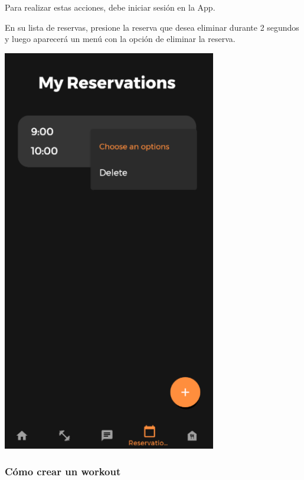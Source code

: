 \documentclass[12pt,a4paper]{article}
\begin{document}
\begin{enumerate}
\item Para realizar estas acciones, debe iniciar sesión en la App.

\begin{minipage}{.60\textwidth}
  \item En su lista de reservas, presione la reserva que desea eliminar durante 2 segundos y luego aparecerá un menú con la opción de eliminar la reserva.
\end{minipage}
\begin{minipage}{.40\textwidth}
  \includegraphics[width=0.7\textwidth, right]{eliminarreserva}
\end{minipage}

\end{enumerate}



\clearpage

\subsubsection{Cómo crear un workout}
\end{document}
